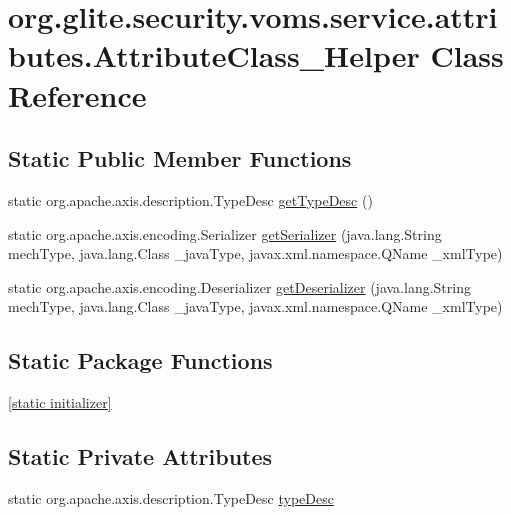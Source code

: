 \hypertarget{classorg_1_1glite_1_1security_1_1voms_1_1service_1_1attributes_1_1AttributeClass__Helper}{
\section{org.glite.security.voms.service.attributes.AttributeClass\_\-Helper Class Reference}
\label{classorg_1_1glite_1_1security_1_1voms_1_1service_1_1attributes_1_1AttributeClass__Helper}
}
\subsection*{Static Public Member Functions}
\begin{DoxyCompactItemize}
\item 
static org.apache.axis.description.TypeDesc \hyperlink{classorg_1_1glite_1_1security_1_1voms_1_1service_1_1attributes_1_1AttributeClass__Helper_a9416091da214771fdcf6c7436f5abc51}{getTypeDesc} ()
\item 
static org.apache.axis.encoding.Serializer \hyperlink{classorg_1_1glite_1_1security_1_1voms_1_1service_1_1attributes_1_1AttributeClass__Helper_a73acb8cc8ed25f3c413e9a6ecb98166b}{getSerializer} (java.lang.String mechType, java.lang.Class \_\-javaType, javax.xml.namespace.QName \_\-xmlType)
\item 
static org.apache.axis.encoding.Deserializer \hyperlink{classorg_1_1glite_1_1security_1_1voms_1_1service_1_1attributes_1_1AttributeClass__Helper_a4f86f0ccc777f9de3e2195f9cd95e09d}{getDeserializer} (java.lang.String mechType, java.lang.Class \_\-javaType, javax.xml.namespace.QName \_\-xmlType)
\end{DoxyCompactItemize}
\subsection*{Static Package Functions}
\begin{DoxyCompactItemize}
\item 
\hyperlink{classorg_1_1glite_1_1security_1_1voms_1_1service_1_1attributes_1_1AttributeClass__Helper_aa59f3503bb565dbe69dfd726edc9c787}{\mbox{[}static initializer\mbox{]}}
\end{DoxyCompactItemize}
\subsection*{Static Private Attributes}
\begin{DoxyCompactItemize}
\item 
static org.apache.axis.description.TypeDesc \hyperlink{classorg_1_1glite_1_1security_1_1voms_1_1service_1_1attributes_1_1AttributeClass__Helper_a9319fa705e9805c236dc661a03964c1e}{typeDesc}
\end{DoxyCompactItemize}


